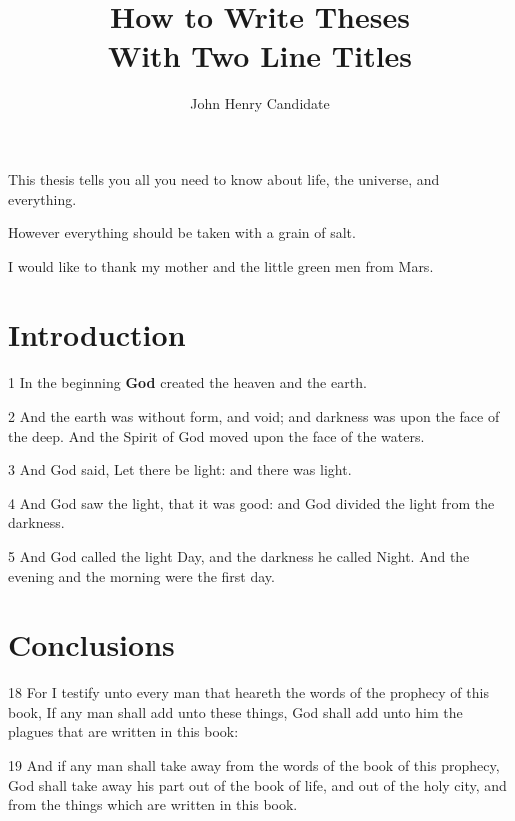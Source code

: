 \documentclass[12pt]{report}
\begin{document}
    \title{How to Write Theses\\
            With Two Line Titles}
    \author{John Henry Candidate}
 
    \beforepreface
        This thesis tells you all you need to know about life, the
        universe, and everything.

\newpage

However everything should be taken with a grain of salt.


        I would like to thank my mother and the little green men from
        Mars. 

    \afterpreface
 
    \chapter{Introduction}
    
    1 In the beginning {\bfseries God} created the heaven and the earth.
    
    2 And the earth was without form, and void; and darkness was upon
    the face of the deep. And the Spirit of God moved upon the face of
    the waters.
    
    3 And God said, Let there be light: and there was light.
    
    4 And God saw the light, that it was good: and God divided the
    light from the darkness.
    
    5 And God called the light Day, and the darkness he called Night.
    And the evening and the morning were the first day.


    \chapter{Conclusions}

    
    18 For I testify unto every man that heareth the words of the
    prophecy of this book, If any man shall add unto these things, God
    shall add unto him the plagues that are written in this book:
    
    19 And if any man shall take away from the words of the book of
    this prophecy, God shall take away his part out of the book of
    life, and out of the holy city, and from the things which are
    written in this book.
\end{document}
